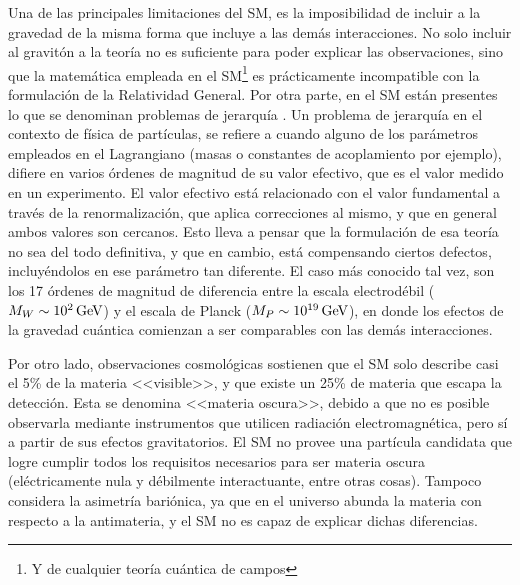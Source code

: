 Una de las principales limitaciones del SM, es la imposibilidad de incluir a la gravedad de la misma forma que incluye a las demás interacciones. No solo incluir al gravitón a la teoría no es suficiente para poder explicar las observaciones, sino que la matemática empleada en el SM\footnote{Y de cualquier teoría cuántica de campos} es prácticamente incompatible con la formulación de la Relatividad General. Por otra parte, en el SM están presentes lo que se denominan problemas de jerarquía \cite{tHooft:1980xss}. 
Un problema de jerarquía en el contexto de física de partículas, se refiere a cuando alguno de los parámetros empleados en el Lagrangiano (masas o constantes de acoplamiento por ejemplo), difiere en varios órdenes de magnitud de su valor efectivo, que es el valor medido en un experimento. El valor efectivo está relacionado con el valor fundamental a través de la renormalización, que aplica correcciones al mismo, y que en general ambos valores son cercanos.
Esto lleva a pensar que la formulación de esa teoría no sea del todo definitiva, y que en cambio, está compensando ciertos defectos, incluyéndolos en ese parámetro tan diferente. 
El caso más conocido tal vez, son los 17 órdenes de magnitud de diferencia entre la escala electrodébil ($M_W\sim 10^{2}\,\text{GeV}$) y el escala de Planck ($M_P\sim 10^{19}\,\text{GeV}$), en donde los efectos de la gravedad cuántica comienzan a ser comparables con las demás interacciones.

Por otro lado, observaciones cosmológicas sostienen que el SM solo describe casi el 5\% de la materia <<visible>>, y que existe un 25\% de materia que escapa la detección. Esta se denomina <<materia oscura>>, debido a que no es posible observarla mediante instrumentos que utilicen radiación electromagnética, pero sí a partir de sus efectos gravitatorios. El SM no provee una partícula candidata que logre cumplir todos los requisitos necesarios para ser materia oscura (eléctricamente nula y débilmente interactuante, entre otras cosas). Tampoco considera la asimetría bariónica, ya que en el universo abunda la materia con respecto a la antimateria, y el SM no es capaz de explicar dichas diferencias.

